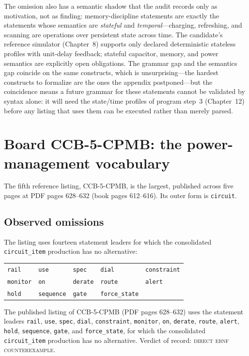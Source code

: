The omission also has a semantic shadow that the audit records only as motivation, not as finding: memory-discipline statements are exactly the statements whose semantics are \emph{stateful} and \emph{temporal}---charging, refreshing, and scanning are operations over persistent state across time. The candidate's reference simulator (Chapter~8) supports only declared deterministic stateless profiles with unit-delay feedback; stateful capacitor, memory, and power semantics are explicitly open obligations. The grammar gap and the semantics gap coincide on the same constructs, which is unsurprising---the hardest constructs to formalize are the ones the appendix postponed---but the coincidence means a future grammar for these statements cannot be validated by syntax alone: it will need the state/time profiles of program step~3 (Chapter~12) before any listing that uses them can be executed rather than merely parsed.

\section{Board CCB-5-CPMB: the power-management vocabulary}\label{ch10:ccb5}

The fifth reference listing, CCB-5-CPMB, is the largest, published across five pages at PDF pages 628--632 (book pages 612--616). Its outer form is \texttt{circuit}.

\subsection{Observed omissions}

The listing uses fourteen statement leaders for which the consolidated \texttt{circuit\_item} production has no alternative:

\begin{center}
\begin{tabular}{@{}lllll@{}}
\toprule
\texttt{rail} & \texttt{use} & \texttt{spec} & \texttt{dial} & \texttt{constraint} \\
\texttt{monitor} & \texttt{on} & \texttt{derate} & \texttt{route} & \texttt{alert} \\
\texttt{hold} & \texttt{sequence} & \texttt{gate} & \texttt{force\_state} & \\
\bottomrule
\end{tabular}
\end{center}

\begin{finding}\label{ch10:find-ccb5}
The published listing of CCB-5-CPMB (PDF pages 628--632) uses the statement leaders \texttt{rail}, \texttt{use}, \texttt{spec}, \texttt{dial}, \texttt{constraint}, \texttt{monitor}, \texttt{on}, \texttt{derate}, \texttt{route}, \texttt{alert}, \texttt{hold}, \texttt{sequence}, \texttt{gate}, and \texttt{force\_state}, for which the consolidated \texttt{circuit\_item} production has no alternative. Verdict of record: \textsc{direct ebnf counterexample}.
\end{finding}

